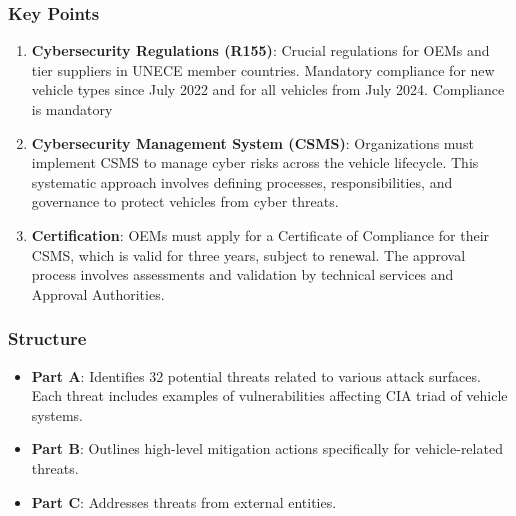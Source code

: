 \subsubsection{Key Points}\label{subsubsec:key-points}
\begin{enumerate}
    \item \textbf{Cybersecurity Regulations (R155)}: Crucial regulations for OEMs and tier suppliers in UNECE member countries.
    Mandatory compliance for new vehicle types since July 2022 and for all vehicles from July 2024.
    Compliance is mandatory
    \item \textbf{Cybersecurity Management System (CSMS)}: Organizations must implement CSMS to manage cyber risks across the vehicle lifecycle.
    This systematic approach involves defining processes, responsibilities, and governance to protect vehicles from cyber threats.
    \item \textbf{Certification}: OEMs must apply for a Certificate of Compliance for their CSMS, which is valid for three years, subject to renewal.
    The approval process involves assessments and validation by technical services and Approval Authorities.
\end{enumerate}


\subsubsection{Structure}\label{subsubsec:structure}
\begin{itemize}
    \item \textbf{Part A}: Identifies 32 potential threats related to various attack surfaces.
    Each threat includes examples of vulnerabilities affecting CIA triad of vehicle systems.
    \item \textbf{Part B}: Outlines high-level mitigation actions specifically for vehicle-related threats.
    \item \textbf{Part C}: Addresses threats from external entities.
\end{itemize}

